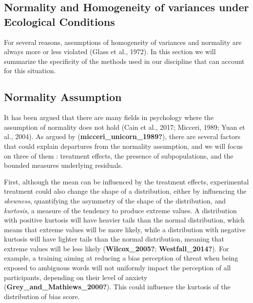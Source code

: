 \documentclass[
  english,
  man]{apa6}
\begin{document}
\hypertarget{normality-and-homogeneity-of-variances-under-ecological-conditions}{%
\subsection{Normality and Homogeneity of variances under Ecological Conditions}\label{normality-and-homogeneity-of-variances-under-ecological-conditions}}

For several reasons, assumptions of homogeneity of variances and normality are always more or less violated (Glass et al., 1972). In this section we will summarize the specificity of the methods used in our discipline that can account for this situation.

\hypertarget{normality-assumption}{%
\subsection{Normality Assumption}\label{normality-assumption}}

It has been argued that there are many fields in psychology where the assumption of normality does not hold (Cain et al., 2017; Micceri, 1989; Yuan et al., 2004). As argued by (\textbf{micceri\_unicorn\_1989?}), there are several factors that could explain departures from the normality assumption, and we will focus on three of them : treatment effects, the presence of subpopulations, and the bounded measures underlying residuals.

First, although the mean can be influenced by the treatment effects, experimental treatment could also change the shape of a distribution, either by influencing the \emph{skewness}, quantifying the asymmetry of the shape of the distribution, and \emph{kurtosis}, a measure of the tendency to produce extreme values. A distribution with positive kurtosis will have heavier tails than the normal distribution, which means that extreme values will be more likely, while a distribution with negative kurtosis will have lighter tails than the normal distribution, meaning that extreme values will be less likely (\textbf{Wilcox\_2005?}; \textbf{Westfall\_2014?}). For example, a training aiming at reducing a bias perception of threat when being exposed to ambiguous words will not uniformly impact the perception of all participants, depending on their level of anxiety (\textbf{Grey\_and\_Mathiews\_2000?}). This could influence the kurtosis of the distribution of bias score.
\end{document}
